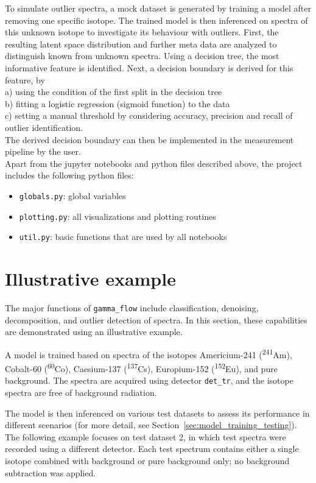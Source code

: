 \documentclass[preprint,12pt, a4paper]{elsarticle}
\begin{document}
To simulate outlier spectra, a mock dataset is generated by training a model after removing one specific isotope. The trained model is then inferenced on spectra of this unknown isotope to investigate its behaviour with outliers. 
First, the resulting latent space distribution and further meta data are analyzed to distinguish known from unknown spectra. Using a decision tree, the most informative feature is identified. 
Next, a decision boundary is derived for this feature, by  \\
a) using the condition of the first split in the decision tree \\
b) fitting a logistic regression (sigmoid function) to the data \\ 
c) setting a manual threshold by considering accuracy, precision and recall of outlier identification. \\
The derived decision boundary can then be implemented in the measurement pipeline by the user. \\


Apart from the jupyter notebooks and python files described above, the project includes the following python files:  
\begin{itemize}
\item \texttt{globals.py}: global variables  
\item \texttt{plotting.py}: all visualizations and plotting routines    
\item \texttt{util.py}: basic functions that are used by all notebooks  
\end{itemize}


\section{Illustrative example}

The major functions of \texttt{gamma\_flow} include classification, denoising, decomposition, and outlier detection of spectra. In this section, these capabilities are demonstrated using an illustrative example. 

A model is trained based on spectra of the isotopes Americium-241 (\textsuperscript{241}Am), Cobalt-60 (\textsuperscript{60}Co), Caesium-137 (\textsuperscript{137}Cs), Europium-152 (\textsuperscript{152}Eu), and pure background. The spectra are acquired using detector \texttt{det\_tr}, and the isotope spectra are free of background radiation.

The model is then inferenced on various test datasets to assess its performance in different scenarios (for more detail, see Section~\ref{sec:model_training_testing}). The following example focuses on test dataset 2, in which test spectra were recorded using a different detector. Each test spectrum contains either a single isotope combined with background or pure background only; no background subtraction was applied.
\end{document}
